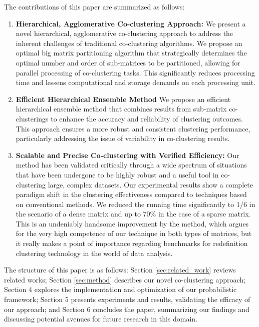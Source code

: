 The contributions of this paper are summarized as follows:
\begin{enumerate}
    \item \textbf{Hierarchical, Agglomerative Co-clustering Approach: }We present a novel hierarchical, agglomerative co-clustering approach to address the inherent challenges of traditional co-clustering algorithms. We propose an optimal big matrix partitioning algorithm that strategically determines the optimal number and order of sub-matrices to be partitioned, allowing for parallel processing of co-clustering tasks. This significantly reduces processing time and lessens computational and storage demands on each processing unit.
    \item \textbf{Efficient Hierarchical Ensemble Method} We propose an efficient hierarchical ensemble method that combines results from sub-matrix co-clusterings to enhance the accuracy and reliability of clustering outcomes. This approach ensures a more robust and consistent clustering performance, particularly addressing the issue of variability in co-clustering results.
    \item \textbf{Scalable and Precise Co-clustering with Verified Efficiency: } Our method has been validated critically through a wide spectrum of situations that have been undergone to be highly robust and a useful tool in co-clustering large, complex datasets. Our experimental results show a complete paradigm shift in the clustering effectiveness compared to techniques based on conventional methods. 
    We reduced the running time significantly to 1/6 in the scenario of a dense matrix and up to 70\% in the case of a sparse matrix.
    This is an undeniably handsome improvement by the method, which argues for the very high competence of our technique in both types of matrices, but it really makes a point of importance regarding benchmarks for redefinition clustering technology in the world of data analysis. 
\end{enumerate}

The structure of this paper is as follows: Section \ref{sec:related_work} reviews related works; Section \ref{sec:method} describes our novel co-clustering approach; Section 4 explores the implementation and optimization of our probabilistic framework; Section 5 presents experiments and results, validating the efficacy of our approach; and Section 6 concludes the paper, summarizing our findings and discussing potential avenues for future research in this domain.
 